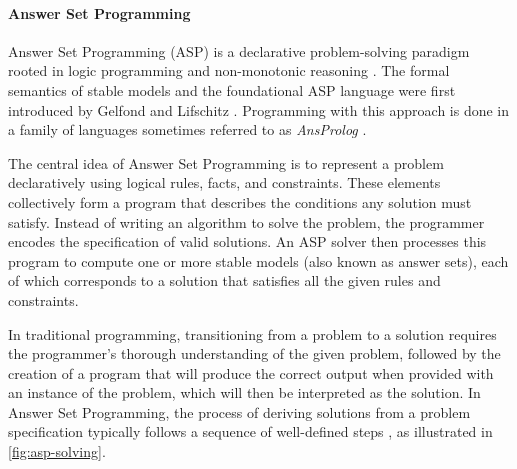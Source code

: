 \documentclass[10pt,leqno]{amsart}
\begin{document}
\paragraph{\textbf{Answer Set Programming}}

Answer Set Programming (ASP) \cite{Eiter2009} is a declarative problem-solving paradigm 
rooted in logic programming and non-monotonic reasoning \cite{Brewka2011}. 
The formal semantics of stable models and the foundational ASP language 
were first introduced by Gelfond and Lifschitz \cite{Gelfond2000, gel88}.
Programming with this approach is done in a family of languages 
sometimes referred to as \textit{AnsProlog} \cite{Gelfond2002}.

The central idea of Answer Set Programming is to represent a problem 
declaratively using logical rules, facts, and constraints. 
These elements collectively form a program that describes the conditions any solution must satisfy. 
Instead of writing an algorithm to solve the problem, 
the programmer encodes the specification of valid solutions. 
An ASP solver then processes this program to compute one or more stable models (also known as answer sets),
each of which corresponds to a solution that satisfies all the given rules and constraints.

In traditional programming, transitioning from a problem to a solution 
requires the programmer's thorough understanding of the given problem, 
followed by the creation of a program that will produce the correct output 
when provided with an instance of the problem, which will then be interpreted as the solution. 
In Answer Set Programming, the process of deriving solutions from a problem specification 
typically follows a sequence of well-defined steps \cite{Gebser2013}, 
as illustrated in \cref{fig:asp-solving}.
\end{document}
